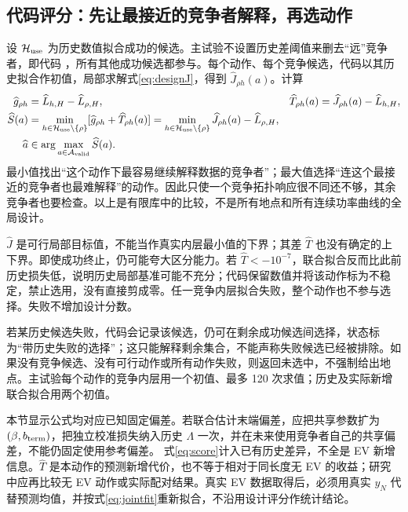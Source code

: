 \documentclass[UTF8,fontset=fandol,11pt,a4paper]{ctexart}
\newcommand{\HH}{\mathcal H}
\begin{document}
\subsection{代码评分：先让最接近的竞争者解释，再选动作}
设 $\HH_{\rm use}$ 为历史数值拟合成功的候选。主试验不设置历史差阈值来删去“远”竞争者，即代码 ，所有其他成功候选都参与。每个动作、每个竞争候选，代码以其历史拟合作初值，局部求解式\eqref{eq:designJ}，得到 $\widehat J_{\rho h}(a)$。计算
\begin{align}
 \widehat g_{\rho h}&=\widehat L_{h,H}-\widehat L_{\rho,H},&
 \widehat T_{\rho h}(a)&=\widehat J_{\rho h}(a)-\widehat L_{h,H},
      \label{eq:implementedparts}\\
 \widehat S(a)&=
    \min_{h\in\HH_{\rm use}\setminus\{\rho\}}
       [\widehat g_{\rho h}+\widehat T_{\rho h}(a)]
    =\min_{h\in\HH_{\rm use}\setminus\{\rho\}}\widehat J_{\rho h}(a)-\widehat L_{\rho,H},
      \label{eq:score}\\
 \widehat a&\in\arg\max_{a\in\mathcal A_{\rm valid}}\widehat S(a).
      \label{eq:select}
\end{align}
最小值找出“这个动作下最容易继续解释数据的竞争者”；最大值选择“连这个最接近的竞争者也最难解释”的动作。因此只使一个竞争拓扑响应很不同还不够，其余竞争者也要检查。以上是有限库中的比较，不是所有地点和所有连续功率曲线的全局设计。

$\widehat J$ 是可行局部目标值，不能当作真实内层最小值的下界；其差 $\widehat T$ 也没有确定的上下界。即使成功终止，仍可能夸大区分能力。若 $\widehat T<-10^{-7}$，联合拟合反而比此前历史损失低，说明历史局部基准可能不充分；代码保留数值并将该动作标为不稳定，禁止选用，没有直接剪成零。任一竞争内层拟合失败，整个动作也不参与选择。失败不增加设计分数。

若某历史候选失败，代码会记录该候选，仍可在剩余成功候选间选择，状态标为“带历史失败的选择”；这只能解释剩余集合，不能声称失败候选已经被排除。如果没有竞争候选、没有可行动作或所有动作失败，则返回未选中，不强制给出地点。主试验每个动作的竞争内层用一个初值、最多 120 次求值；历史及实际新增联合拟合用两个初值。

本节显示公式均对应已知固定偏差。若联合估计末端偏差，应把共享参数扩为 $(\beta,b_{\rm term})$，把独立校准损失纳入历史 $\Lambda$ 一次，并在未来使用竞争者自己的共享偏差，不能仍固定使用参考偏差。
式\eqref{eq:score}计入已有历史差异，不全是 EV 新增信息。$\widehat T$ 是本动作的预测新增代价，也不等于相对于同长度无 EV 的收益；研究中应再比较无 EV 动作或实际配对结果。真实 EV 数据取得后，必须用真实 $y_N$ 代替预测均值，并按式\eqref{eq:jointfit}重新拟合，不沿用设计评分作统计结论。
\end{document}
